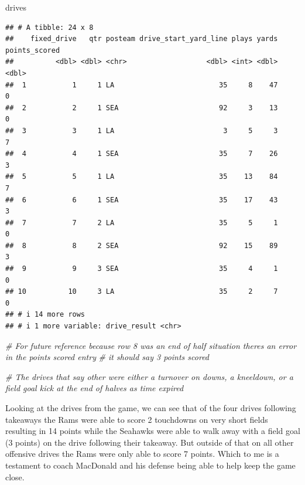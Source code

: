 \documentclass[
]{article}
\newenvironment{Shaded}{\begin{snugshade}}{\end{snugshade}}
\newcommand{\CommentTok}[1]{\textcolor[rgb]{0.56,0.35,0.01}{\textit{#1}}}
\newcommand{\NormalTok}[1]{#1}
\begin{document}
\begin{Shaded}
\begin{Highlighting}[]
\NormalTok{drives}
\end{Highlighting}
\end{Shaded}

\begin{verbatim}
## # A tibble: 24 x 8
##    fixed_drive   qtr posteam drive_start_yard_line plays yards points_scored
##          <dbl> <dbl> <chr>                   <dbl> <int> <dbl>         <dbl>
##  1           1     1 LA                         35     8    47             0
##  2           2     1 SEA                        92     3    13             0
##  3           3     1 LA                          3     5     3             7
##  4           4     1 SEA                        35     7    26             3
##  5           5     1 LA                         35    13    84             7
##  6           6     1 SEA                        35    17    43             3
##  7           7     2 LA                         35     5     1             0
##  8           8     2 SEA                        92    15    89             3
##  9           9     3 SEA                        35     4     1             0
## 10          10     3 LA                         35     2     7             0
## # i 14 more rows
## # i 1 more variable: drive_result <chr>
\end{verbatim}

\begin{Shaded}
\begin{Highlighting}[]
\CommentTok{\# For future reference because row 8 was an end of half situation there\textquotesingle{}s an error in the points scored entry }
\CommentTok{\# it should say 3 points scored}

\CommentTok{\# The drives that say other were either a turnover on downs, a kneeldown, or a field goal kick at the end of halves as time expired}
\end{Highlighting}
\end{Shaded}

Looking at the drives from the game, we can see that of the four drives
following takeaways the Rams were able to score 2 touchdowns on very
short fields resulting in 14 points while the Seahawks were able to walk
away with a field goal (3 points) on the drive following their takeaway.
But outside of that on all other offensive drives the Rams were only
able to score 7 points. Which to me is a testament to coach MacDonald
and his defense being able to help keep the game close.
\end{document}

